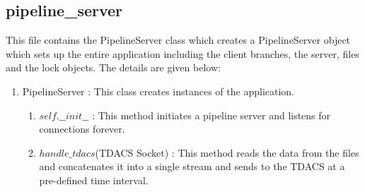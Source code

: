 \subsection{pipeline\_server}
This file contains the PipelineServer class which creates a PipelineServer
object which sets up the entire application including the
client branches, the server, files and the lock objects. The details are given
below:
\begin{enumerate}
	\item PipelineServer : This class creates instances of the application.
		\begin{enumerate}
		\item $self.\_\_init\_\_$ : This method initiates a pipeline server and
			listens for connections forever.
		\item $handle\_tdacs$(TDACS Socket) : This method reads the data from
			the files and concatenates it into a single stream and sends to the
			TDACS at a pre-defined time interval.
		\end{enumerate}
\end{enumerate}


